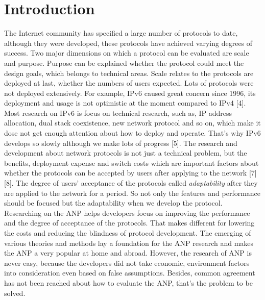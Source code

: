 \documentclass{article}
\begin{document}
\section{Introduction}
The Internet community has specified a large number of protocols to date, although they were developed, these
protocols have achieved varying degrees of success. Two major dimensions on which a protocol can be evaluated
are scale and purpose. Purpose can be explained whether the protocol could meet the design goals, which belongs
to technical areas. Scale relates to the protocols are deployed at last, whether the numbers of users expected.
Lots of protocols were not deployed extensively. For example, IPv6 caused great concern since 1996, its deployment
and usage is not optimistic at the moment compared to IPv4 [4]. Most research on IPv6 is focus on technical
research, such as, IP address allocation, dual stack coexistence, new network protocol and so on, which make
it dose not get enough attention about how to deploy and operate. That's why IPv6 develops so slowly although
we make lots of progress [5]. The research and development about network protocols is not just a technical
problem, but the benefits, deployment expense and switch costs which are important factors about whether the 
protocols can be accepted by users after applying to the network [7][8]. The degree of users' acceptance
of the protocols called \emph{adaptability} after they are applied to the network for a period. So not only 
the features and performance should be focused but the adaptability when we develop the protocol. Researching 
on the ANP helps developers focus on improving the performance and the degree of acceptance of the protocols. 
That makes different for lowering the costs and reducing the blindness of protocol development. The emerging 
of various theories and methods lay a foundation for the ANP research and makes the ANP a very popular at 
home and abroad. However, the research of ANP is never easy, because the developers did not take economic, 
environment factors into consideration even based on false assumptions. Besides, common agreement has not 
been reached about how to evaluate the ANP, that's the problem to be solved.
\end{document}

